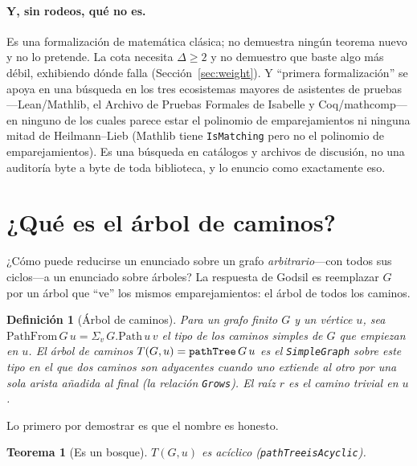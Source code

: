\documentclass[11pt]{article}
\newtheorem{theorem}{Teorema}
\newtheorem{definition}{Definici\'on}
\newcommand{\lean}[1]{{\def\_{\textunderscore\allowbreak}\texttt{#1}}}
\begin{document}
\paragraph{Y, sin rodeos, qu\'e no es.} Es una formalizaci\'on de matem\'atica
cl\'asica; no demuestra ning\'un teorema nuevo y no lo pretende. La cota necesita
$\Delta\ge2$ y no demuestro que baste algo m\'as d\'ebil, exhibiendo d\'onde falla
(Secci\'on~\ref{sec:weight}). Y ``primera formalizaci\'on'' se apoya en una
b\'usqueda en los tres ecosistemas mayores de asistentes de pruebas---Lean/Mathlib,
el Archivo de Pruebas Formales de Isabelle y Coq/mathcomp---en ninguno de los cuales
parece estar el polinomio de emparejamientos ni ninguna mitad de Heilmann--Lieb
(Mathlib tiene \lean{IsMatching} pero no el polinomio de emparejamientos). Es una
b\'usqueda en cat\'alogos y archivos de discusi\'on, no una auditor\'ia byte a byte
de toda biblioteca, y lo enuncio como exactamente eso.



\section{¿Qu\'e es el \'arbol de caminos?}
\label{sec:pathtree}

¿C\'omo puede reducirse un enunciado sobre un grafo \emph{arbitrario}---con todos
sus ciclos---a un enunciado sobre \'arboles? La respuesta de Godsil es reemplazar
$G$ por un \'arbol que ``ve'' los mismos emparejamientos: el \'arbol de todos los
caminos.

\begin{definition}[\'Arbol de caminos]
\label{def:pathtree}
Para un grafo finito $G$ y un v\'ertice $u$, sea
$\mathrm{PathFrom}\,G\,u=\Sigma_{v}\,G.\mathrm{Path}\,u\,v$ el tipo de los caminos
simples de $G$ que empiezan en $u$. El \emph{\'arbol de caminos}
$T(G,u)=\lean{pathTree}\,G\,u$ es el \lean{SimpleGraph} sobre este tipo en el que
dos caminos son adyacentes cuando uno extiende al otro por una sola arista a\~nadida
al final (la relaci\'on \lean{Grows}). El raíz $r$ es el camino trivial en $u$.
\end{definition}

Lo primero por demostrar es que el nombre es honesto.

\begin{theorem}[Es un bosque]
\label{thm:acyclic}
$T(G,u)$ es ac\'iclico (\lean{pathTree\_isAcyclic}).
\end{theorem}
\end{document}
